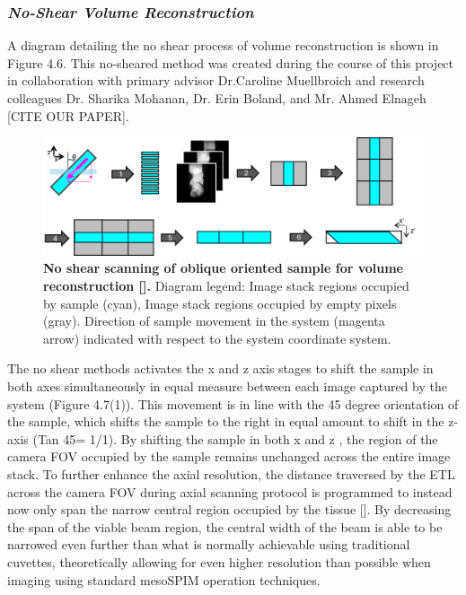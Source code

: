 \subsubsection{\textit{No-Shear Volume Reconstruction}}

A diagram detailing the no shear process of volume reconstruction is shown in Figure 4.6. This no-sheared method was created during the course of this project in collaboration with primary advisor Dr.Caroline Muellbroich and research colleagues Dr. Sharika Mohanan, Dr. Erin Boland, and Mr. Ahmed Elnageh [CITE OUR PAPER]. 

\begin{figure}[H]
    \centering
    \includegraphics[width=1\linewidth]{Figures/noshear.png}
    \medskip
    \caption{\textbf{No shear scanning of oblique oriented sample for volume reconstruction [].} Diagram legend: Image stack regions occupied by sample (cyan), Image stack regions occupied by empty pixels (gray). Direction of sample movement in the system (magenta arrow) indicated with respect to the system coordinate system.}
    \label{fig:enter-label}
\end{figure}

 The no shear methods activates the x and z axis stages to shift the sample in both axes simultaneously in equal measure between each image captured by the system (Figure 4.7(1)). This movement is in line with the 45 degree orientation of the sample, which shifts the sample to the right in equal amount to shift in the z-axis (Tan 45\degree = 1/1). By shifting the sample in both x and z , the region of the camera FOV occupied by the sample remains unchanged across the entire image stack. To further enhance the axial resolution, the distance traversed by the ETL across the camera FOV during axial scanning protocol is programmed to instead now only span the narrow central region occupied by the tissue []. By decreasing the span of the viable beam region, the central width of the beam is able to be narrowed even further than what is normally achievable using traditional cuvettes, theoretically allowing for even higher resolution than possible when imaging using standard mesoSPIM operation techniques.
 
